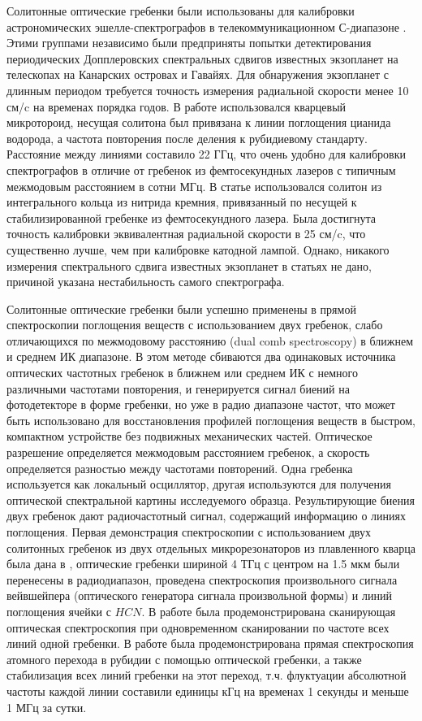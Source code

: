 Солитонные оптические гребенки были использованы для калибровки астрономических эшелле-спектрографов в телекоммуникационном С-диапазоне \cite{Obrzud2019,Suh2019}. Этими группами независимо были предприняты попытки детектирования периодических Допплеровских спектральных сдвигов известных экзопланет на телескопах на Канарских островах и Гавайях. Для обнаружения экзопланет с длинным периодом требуется точность измерения радиальной скорости менее 10 см/c на временах порядка годов. В работе \cite{Suh2019} использовался кварцевый микротороид, несущая солитона был привязана к линии поглощения цианида водорода, а частота повторения после деления к рубидиевому стандарту. Расстояние между линиями составило 22 ГГц, что очень удобно для калибровки спектрографов в отличие от гребенок из фемтосекундных лазеров с типичным межмодовым расстоянием в сотни МГц. В статье \cite{Obrzud2019} использовался солитон из интегрального кольца из нитрида кремния, привязанный по несущей к стабилизированной гребенке из фемтосекундного лазера. Была достигнута точность калибровки эквивалентная радиальной скорости в 25 см/c, что существенно лучше, чем при калибровке катодной лампой. Однако, никакого измерения спектрального сдвига известных экзопланет в статьях не дано, причиной указана нестабильность самого спектрографа.

Солитонные оптические гребенки были успешно применены в прямой спектроскопии поглощения веществ с использованием двух гребенок, слабо отличающихся по межмодовому расстоянию (dual comb spectroscopy) в ближнем \cite{Suh2016} и среднем ИК диапазоне\cite{Yu2018}. В этом методе сбиваются два одинаковых источника оптических частотных гребенок в ближнем или среднем ИК с немного различными частотами повторения, и генерируется сигнал биений на фотодетекторе в форме гребенки, но уже в радио диапазоне частот, что может быть использовано для восстановления профилей поглощения веществ в быстром, компактном устройстве без подвижных механических частей. Оптическое разрешение определяется межмодовым расстоянием гребенок, а скорость определяется разностью между частотами повторений. Одна гребенка используется как локальный осциллятор, другая используются для получения оптической спектральной картины исследуемого образца. Результирующие биения двух гребенок дают радиочастотный сигнал, содержащий информацию о линиях поглощения. Первая демонстрация спектроскопии с использованием двух солитонных гребенок из двух отдельных микрорезонаторов из плавленного кварца была дана в \cite{Suh2016}, оптические гребенки шириной 4 ТГц с центром на 1.5 мкм были перенесены в радиодиапазон, проведена спектроскопия произвольного сигнала вейвшейпера (оптического генератора сигнала произвольной формы) и линий поглощения ячейки с $HCN$. В работе \cite{Yu:17} была продемонстрирована сканирующая оптическая спектроскопия при одновременном сканировании по частоте всех линий одной гребенки. В работе \cite{2018arXiv181209789S} была продемонстрирована прямая спектроскопия атомного перехода в рубидии с помощью оптической гребенки, а также стабилизация всех линий гребенки на этот переход, т.ч. флуктуации абсолютной частоты каждой линии составили единицы кГц на временах 1 секунды и меньше 1 МГц за сутки.

